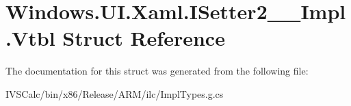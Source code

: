 \hypertarget{struct_windows_1_1_u_i_1_1_xaml_1_1_i_setter2_____impl_1_1_vtbl}{}\section{Windows.\+U\+I.\+Xaml.\+I\+Setter2\+\_\+\+\_\+\+Impl.\+Vtbl Struct Reference}
\label{struct_windows_1_1_u_i_1_1_xaml_1_1_i_setter2_____impl_1_1_vtbl}


The documentation for this struct was generated from the following file\+:\begin{DoxyCompactItemize}
\item 
I\+V\+S\+Calc/bin/x86/\+Release/\+A\+R\+M/ilc/Impl\+Types.\+g.\+cs\end{DoxyCompactItemize}
